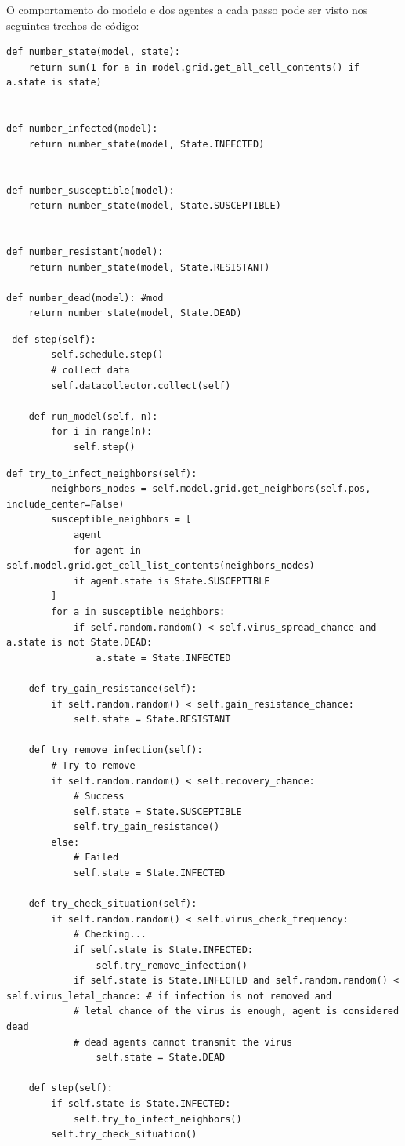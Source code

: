 O comportamento do modelo e dos agentes a cada passo pode ser visto nos seguintes trechos de código:

\begin{verbatim}
def number_state(model, state):
    return sum(1 for a in model.grid.get_all_cell_contents() if a.state is state)


def number_infected(model):
    return number_state(model, State.INFECTED)


def number_susceptible(model):
    return number_state(model, State.SUSCEPTIBLE)


def number_resistant(model):
    return number_state(model, State.RESISTANT)

def number_dead(model): #mod
    return number_state(model, State.DEAD)

\end{verbatim}

\begin{verbatim}
 def step(self):
        self.schedule.step()
        # collect data
        self.datacollector.collect(self)

    def run_model(self, n):
        for i in range(n):
            self.step()
\end{verbatim}

\begin{verbatim}
def try_to_infect_neighbors(self):
        neighbors_nodes = self.model.grid.get_neighbors(self.pos, include_center=False)
        susceptible_neighbors = [
            agent
            for agent in self.model.grid.get_cell_list_contents(neighbors_nodes)
            if agent.state is State.SUSCEPTIBLE
        ]
        for a in susceptible_neighbors:
            if self.random.random() < self.virus_spread_chance and a.state is not State.DEAD:
                a.state = State.INFECTED

    def try_gain_resistance(self):
        if self.random.random() < self.gain_resistance_chance:
            self.state = State.RESISTANT

    def try_remove_infection(self):
        # Try to remove
        if self.random.random() < self.recovery_chance:
            # Success
            self.state = State.SUSCEPTIBLE
            self.try_gain_resistance()
        else:
            # Failed
            self.state = State.INFECTED

    def try_check_situation(self):
        if self.random.random() < self.virus_check_frequency:
            # Checking...
            if self.state is State.INFECTED:
                self.try_remove_infection()
            if self.state is State.INFECTED and self.random.random() < self.virus_letal_chance: # if infection is not removed and
            # letal chance of the virus is enough, agent is considered dead
            # dead agents cannot transmit the virus
                self.state = State.DEAD

    def step(self):
        if self.state is State.INFECTED:
            self.try_to_infect_neighbors()
        self.try_check_situation()
\end{verbatim}



